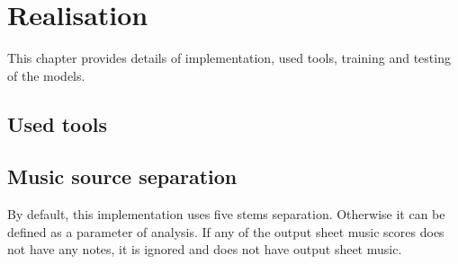 \chapter{Realisation}\label{ch:realisation}

This chapter provides details of implementation, used tools, training and testing of the models.

\section{Used tools}\label{sec:used-tools}


\section{Music source separation}\label{sec:realisation:music-source-separation}
By default, this implementation uses five stems separation. Otherwise it can be defined as a parameter of analysis.
If any of the output sheet music scores does not have any notes, it is ignored and does not have output sheet music.

